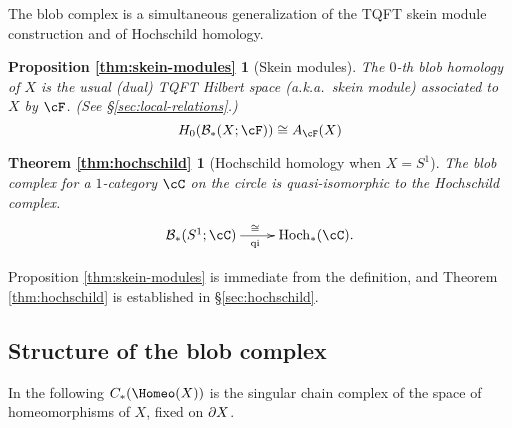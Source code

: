 The blob complex is a simultaneous generalization of the TQFT skein module construction and of Hochschild homology.

\newtheorem*{thm:skein-modules}{Proposition \ref{thm:skein-modules}}

\begin{thm:skein-modules}[Skein modules]
The $0$-th blob homology of $X$ is the usual 
(dual) TQFT Hilbert space (a.k.a.\ skein module) associated to $X$
by $\cF$.
(See \S \ref{sec:local-relations}.)
\begin{equation*}
H_0(\bc_*(X;\cF)) \iso A_{\cF}(X)
\end{equation*}
\end{thm:skein-modules}

\newtheorem*{thm:hochschild}{Theorem \ref{thm:hochschild}}

\begin{thm:hochschild}[Hochschild homology when $X=S^1$]
The blob complex for a $1$-category $\cC$ on the circle is
quasi-isomorphic to the Hochschild complex.
\begin{equation*}
\xymatrix{\bc_*(S^1;\cC) \ar[r]^(0.47){\iso}_(0.47){\text{qi}} & \HC_*(\cC).}
\end{equation*}
\end{thm:hochschild}

Proposition \ref{thm:skein-modules} is immediate from the definition, and
Theorem \ref{thm:hochschild} is established in \S \ref{sec:hochschild}.


\subsection{Structure of the blob complex}
\label{sec:structure}

In the following $\CH{X}$ is the singular chain complex of the space of homeomorphisms of $X$, fixed on $\partial X$.

\newtheorem*{thm:CH}{Theorem \ref{thm:CH}}


